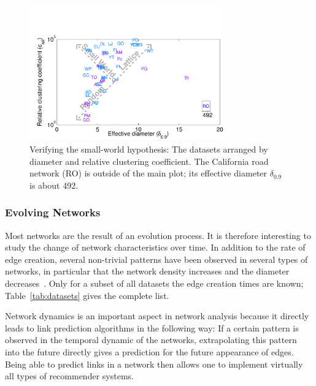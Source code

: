 \documentclass[11pt,a4paper]{book}
\newcommand{\wOnePointFive}{0.75}
\begin{document}
\begin{figure}[h!]
  \centering
  \includegraphics[width=\wOnePointFive\textwidth]{img-st/scatter.smallworldnorm.a}
  \caption{
    Verifying the small-world hypothesis:  The datasets arranged
    by diameter and relative clustering coefficient. 
    The California road network (\textsf{RO}) is outside of the main plot; its
    effective diameter $\delta_{0.9}$ is about 492.   
  }  
  \label{fig:scatter.smallworldnorm}
\end{figure}

\subsubsection{Evolving Networks}
Most networks are the result of an evolution process.  It is therefore
interesting to study the change of network characteristics over
time.  In addition to the rate of edge creation, several
non-trivial patterns have been observed in several types of networks, in
particular that 
the network density increases and the diameter decreases~\cite{b242}. 
Only for a subset of all datasets the edge creation times are known; 
Table~\ref{tab:datasets} gives the complete list. 

Network dynamics is an important aspect in network analysis because it directly
leads to link prediction algorithms in the following way:  If a certain
pattern is observed in the temporal dynamic of the networks,
extrapolating this pattern into the future directly gives a prediction
for the future appearance of edges.  Being able to predict links in a
network then allows one to implement virtually all types of recommender
systems. 
\end{document}

